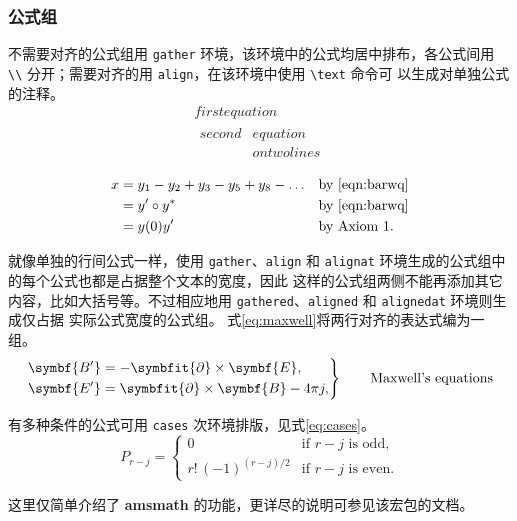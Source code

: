 \subsubsection{公式组}

不需要对齐的公式组用 \texttt{gather} 环境，该环境中的公式均居中排布，各公式间用
\verb|\\| 分开；需要对齐的用 \texttt{align}，在该环境中使用 \verb|\text| 命令可
以生成对单独公式的注释。
\begin{gather}
  first equation\\
  \begin{split}
    second & equation\\
           & on twolines
  \end{split}
\end{gather}

\begin{align}
 x & = y_1-y_2+y_3-y_5+y_8-\dots && \text{by \eqref{eqn:barwq}}\\
   & = y'\circ y^*               && \text{by \eqref{eqn:barwq}}\\
   & = y(0) y'                   && \text{by Axiom 1.}
\end{align}

就像单独的行间公式一样，使用 \texttt{gather}、\texttt{align} 和
\texttt{alignat} 环境生成的公式组中的每个公式也都是占据整个文本的宽度，因此
这样的公式组两侧不能再添加其它内容，比如大括号等。不过相应地用
\texttt{gathered}、\texttt{aligned} 和 \texttt{alignedat} 环境则生成仅占据
实际公式宽度的公式组。
式\eqref{eq:maxwell}将两行对齐的表达式编为一组。
\begin{equation}
\label{eq:maxwell}
\left. \begin{aligned}
  \symbf{B'}&=-\symbfit{\partial}\times \symbf{E},\\
  \symbf{E'}&=\symbfit{\partial}\times \symbf{B} - 4\pi j,
\end{aligned}
\right\}
\qquad \text{Maxwell's equations}
\end{equation}

有多种条件的公式可用 \texttt{cases} 次环境排版，见式\eqref{eq:cases}。
\begin{equation}
\label{eq:cases}
P_{r-j}=\begin{cases}
  0& \text{if $r-j$ is odd},\\
  r!\,(-1)^{(r-j)/2}& \text{if $r-j$ is even}.
\end{cases}
\end{equation}

这里仅简单介绍了 \textbf{amsmath} 的功能，更详尽的说明可参见该宏包的文档。

